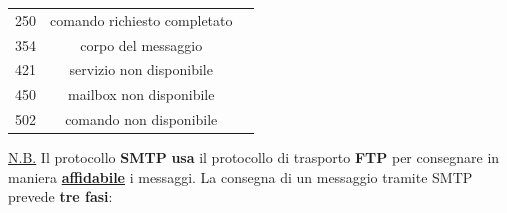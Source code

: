 \documentclass[11pt,a4paper]{article}
\theoremstyle{definition}
\begin{document}
\begin{itemize}
\begin{table}[h!]
\begin{center}
\begin{tabular}{l|c|c}
				      250             & comando richiesto completato             \\
				      354             & corpo del messaggio                      \\
				      421             & servizio non disponibile                 \\
				      450             & mailbox non disponibile                  \\
				      502             & comando non disponibile                  \\
			      \end{tabular}
		      \end{center}
	      \end{table}
\end{itemize}
\newpage
\underline{N.B.} Il protocollo \textbf{SMTP} \textbf{usa} il protocollo di trasporto \textbf{FTP} per consegnare in maniera \textbf{\underline{affidabile}} i messaggi.\newline\newline
La consegna di un messaggio tramite SMTP prevede \textbf{tre fasi}:
\end{document}
